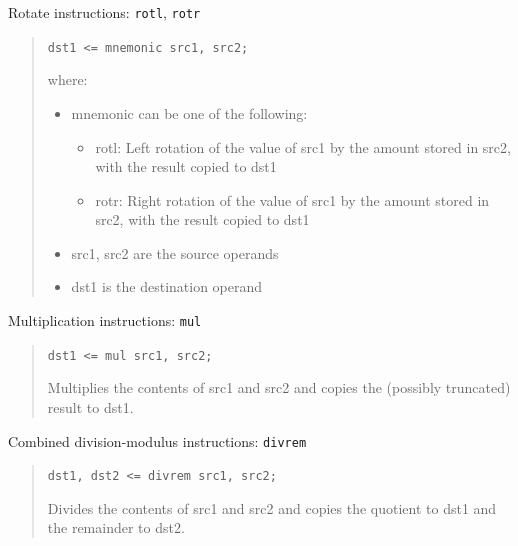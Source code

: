 \documentclass[a4paper]{article}
\begin{document}
Rotate instructions: \texttt{rotl}, \texttt{rotr}
%
\begin{quote}

\texttt{dst1 <= mnemonic src1, src2;}

where:
%
\begin{itemize}

\item mnemonic can be one of the following:
%
\begin{itemize}

\item rotl: Left rotation of the value of src1 by the amount stored in src2,
with the result copied to dst1

\item rotr: Right rotation of the value of src1 by the amount stored in src2,
with the result copied to dst1

\end{itemize}

\item src1, src2 are the source operands

\item dst1 is the destination operand

\end{itemize}

\end{quote}

Multiplication instructions: \texttt{mul}
%
\begin{quote}

\texttt{dst1 <= mul src1, src2;}

Multiplies the contents of src1 and src2 and copies the (possibly truncated)
result to dst1.

\end{quote}

Combined division-modulus instructions: \texttt{divrem}
%
\begin{quote}

\texttt{dst1, dst2 <= divrem src1, src2;}

Divides the contents of src1 and src2 and copies the quotient to dst1 and
the remainder to dst2.

\end{quote}
\end{document}
